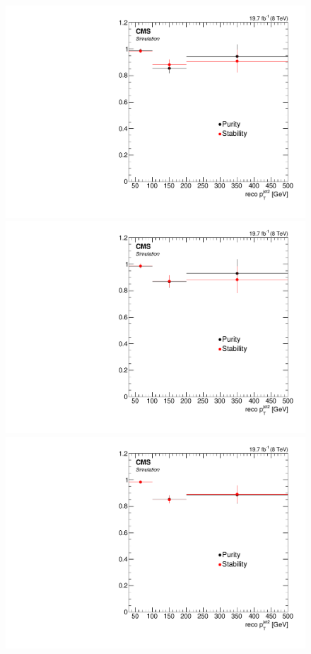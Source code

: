\begin{figure}[hbtp]
  \begin{center}
    \includegraphics[width=0.8\cmsFigWidth]{Figures/Unfolding/BinMigration/PurityStability_4m_PtJet2_Mad}
    \includegraphics[width=0.8\cmsFigWidth]{Figures/Unfolding/BinMigration/PurityStability_4e_PtJet2_Mad}
    \includegraphics[width=0.8\cmsFigWidth]{Figures/Unfolding/BinMigration/PurityStability_2e2m_PtJet2_Mad}

\end{center}
\end{figure}
